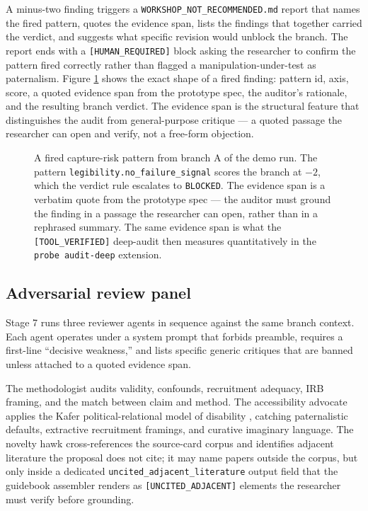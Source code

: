 A minus-two finding triggers a \texttt{WORKSHOP\_NOT\_RECOMMENDED.md} report that names the fired pattern, quotes the evidence span, lists the findings that together carried the verdict, and suggests what specific revision would unblock the branch. The report ends with a \texttt{[HUMAN\_REQUIRED]} block asking the researcher to confirm the pattern fired correctly rather than flagged a manipulation-under-test as paternalism. Figure \ref{fig:audit_finding} shows the exact shape of a fired finding: pattern id, axis, score, a quoted evidence span from the prototype spec, the auditor's rationale, and the resulting branch verdict. The evidence span is the structural feature that distinguishes the audit from general-purpose critique --- a quoted passage the researcher can open and verify, not a free-form objection.

\begin{figure}[t]
\centering

\caption{A fired capture-risk pattern from branch A of the demo run. The pattern \texttt{legibility.no\_failure\_signal} scores the branch at $-2$, which the verdict rule escalates to \texttt{BLOCKED}. The evidence span is a verbatim quote from the prototype spec --- the auditor must ground the finding in a passage the researcher can open, rather than in a rephrased summary. The same evidence span is what the \texttt{[TOOL\_VERIFIED]} deep-audit then measures quantitatively in the \texttt{probe audit-deep} extension.}
\label{fig:audit_finding}
\end{figure}

\subsection{Adversarial review panel}

Stage 7 runs three reviewer agents in sequence against the same branch context. Each agent operates under a system prompt that forbids preamble, requires a first-line ``decisive weakness,'' and lists specific generic critiques that are banned unless attached to a quoted evidence span.

The methodologist audits validity, confounds, recruitment adequacy, IRB framing, and the match between claim and method. The accessibility advocate applies the Kafer political-relational model of disability \citep{kafer2013feminist}, catching paternalistic defaults, extractive recruitment framings, and curative imaginary language. The novelty hawk cross-references the source-card corpus and identifies adjacent literature the proposal does not cite; it may name papers outside the corpus, but only inside a dedicated \texttt{uncited\_adjacent\_literature} output field that the guidebook assembler renders as \texttt{[UNCITED\_ADJACENT]} elements the researcher must verify before grounding.

